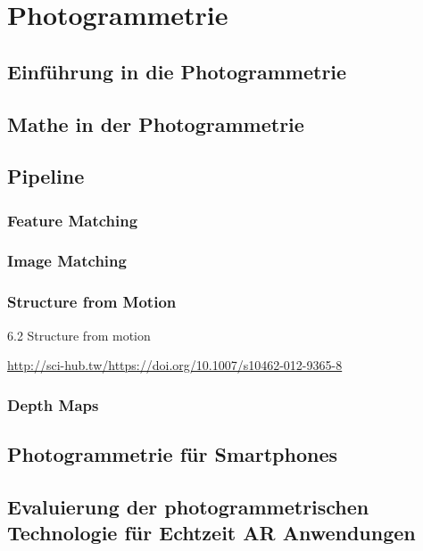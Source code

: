 \chapter{Photogrammetrie}

\section{Einführung in die Photogrammetrie}

\section{Mathe in der Photogrammetrie}

\section{Pipeline}

\subsection{Feature Matching}

\subsection{Image Matching}

\subsection{Structure from Motion}

6.2 Structure from motion

\url{http://sci-hub.tw/https://doi.org/10.1007/s10462-012-9365-8}

\subsection{Depth Maps}

\section{Photogrammetrie für Smartphones}

\section{Evaluierung der photogrammetrischen Technologie für Echtzeit AR Anwendungen}